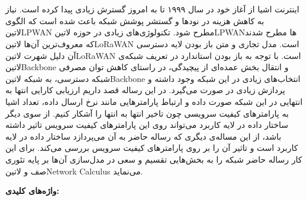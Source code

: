 \newpage\clearpage

\pagestyle{abstract}

\vspace*{-1cm}
\section*{\centering \abstractname}
\vspace*{.5cm}

اینترنت اشیا از آغاز خود در سال ۱۹۹۹ تا به امروز گسترش زیادی پیدا کرده است.
نیاز به کاهش هزینه در نودها و گستشر پوشش شبکه باعث شده است که الگوی ‌لاتین{LPWAN} مطرح شود.
تکنولوژی‌های زیادی در حوزه ‌لاتین{LPWAN}ها مطرح شدند که معروف‌ترین آن‌ها ‌لاتین{LoRaWAN} است. مدل تجاری و متن باز بودن
لایه دسترسی آن دلیل شهرت ‌لاتین{LoRaWAN} است.
با توجه به باز بودن استاندارد در تعریف شبکه‌ی ‌لاتین{Backbone} و انتقال بخش عمده‌ای از پیچیدگی، در راستای کاهش توان مصرفی
شبکه دسترسی، به شبکه ‌لاتین{Backbone} انتخاب‌های زیادی در این شبکه وجود داشته و پردازش زیادی در صورت می‌گیرد.
در این رساله قصد داریم ارزیابی کارایی انتها به انتهایی در این شبکه صورت داده و ارتباط پارامترهایی مانند نرخ ارسال داده، تعداد اشیا
به پارامترهای کیفیت سرویسی چون تاخیر انتها به انتها را آشکار کنیم.
از سوی دیگر ساختار داده در لایه کاربرد می‌تواند روی این پارامترهای کیفیت سرویس تاثیر داشته باشد، از این مساله‌ی دیگری که رساله حاضر به آن می‌پردازد
ساختار داده در لایه کاربرد است و تاثیر آن را بر روی پارامترهای کیفیت سرویس بررسی می‌کند.
برای این کار رساله حاضر شبکه را به بخش‌هایی تقسیم و سعی در مدل‌سازی آن‌ها بر پایه تئوری صف و ‌لاتین{Network Calculus}
می‌نماید.


\vspace*{2cm}

{%
  \noindent\large\textbf{واژه‌های کلیدی:}
}\par
\vspace*{.5cm}

